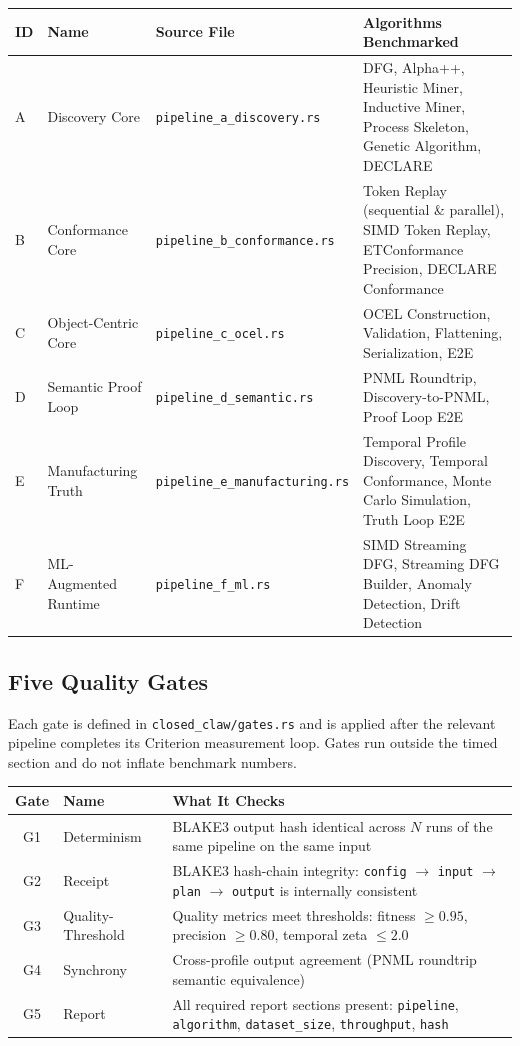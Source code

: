 \documentclass[11pt,a4paper]{article}
\begin{document}
\begin{longtable}{@{}lll>{\raggedright\arraybackslash}p{7cm}@{}}
\toprule
\textbf{ID} & \textbf{Name} & \textbf{Source File} & \textbf{Algorithms Benchmarked} \\
\midrule
\endhead
A & Discovery Core & \texttt{pipeline\_a\_discovery.rs} &
    DFG, Alpha++, Heuristic Miner, Inductive Miner, Process Skeleton,
    Genetic Algorithm, DECLARE \\[4pt]
B & Conformance Core & \texttt{pipeline\_b\_conformance.rs} &
    Token Replay (sequential \& parallel), SIMD Token Replay,
    ETConformance Precision, DECLARE Conformance \\[4pt]
C & Object-Centric Core & \texttt{pipeline\_c\_ocel.rs} &
    OCEL Construction, Validation, Flattening, Serialization, E2E \\[4pt]
D & Semantic Proof Loop & \texttt{pipeline\_d\_semantic.rs} &
    PNML Roundtrip, Discovery-to-PNML, Proof Loop E2E \\[4pt]
E & Manufacturing Truth & \texttt{pipeline\_e\_manufacturing.rs} &
    Temporal Profile Discovery, Temporal Conformance,
    Monte Carlo Simulation, Truth Loop E2E \\[4pt]
F & ML-Augmented Runtime & \texttt{pipeline\_f\_ml.rs} &
    SIMD Streaming DFG, Streaming DFG Builder,
    Anomaly Detection, Drift Detection \\
\bottomrule
\end{longtable}

\subsection{Five Quality Gates}

Each gate is defined in \texttt{closed\_claw/gates.rs} and is applied
after the relevant pipeline completes its Criterion measurement loop.
Gates run outside the timed section and do not inflate benchmark numbers.

\begin{center}
\begin{tabular}{@{}clp{9cm}@{}}
\toprule
\textbf{Gate} & \textbf{Name} & \textbf{What It Checks} \\
\midrule
G1 & Determinism & BLAKE3 output hash identical across $N$ runs of the same
                   pipeline on the same input \\[4pt]
G2 & Receipt & BLAKE3 hash-chain integrity:
               \texttt{config} $\to$ \texttt{input} $\to$ \texttt{plan} $\to$
               \texttt{output} is internally consistent \\[4pt]
G3 & Quality-Threshold & Quality metrics meet thresholds: fitness $\geq 0.95$,
             precision $\geq 0.80$, temporal zeta $\leq 2.0$ \\[4pt]
G4 & Synchrony & Cross-profile output agreement (PNML roundtrip
                 semantic equivalence) \\[4pt]
G5 & Report & All required report sections present:
              \texttt{pipeline}, \texttt{algorithm}, \texttt{dataset\_size},
              \texttt{throughput}, \texttt{hash} \\
\bottomrule
\end{tabular}
\end{center}
\end{document}
